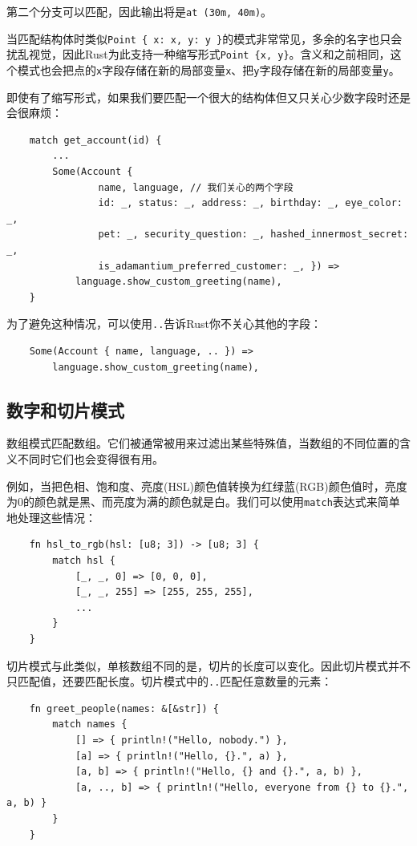 第二个分支可以匹配，因此输出将是\texttt{at (30m, 40m)}。

当匹配结构体时类似\texttt{Point \{ x: x, y: y \}}的模式非常常见，多余的名字也只会扰乱视觉，因此Rust为此支持一种缩写形式\texttt{Point \{x, y\}}。含义和之前相同，这个模式也会把点的\texttt{x}字段存储在新的局部变量\texttt{x}、把\texttt{y}字段存储在新的局部变量\texttt{y}。

即使有了缩写形式，如果我们要匹配一个很大的结构体但又只关心少数字段时还是会很麻烦：
\begin{verbatim}
    match get_account(id) {
        ...
        Some(Account {
                name, language, // 我们关心的两个字段
                id: _, status: _, address: _, birthday: _, eye_color: _,
                pet: _, security_question: _, hashed_innermost_secret: _,
                is_adamantium_preferred_customer: _, }) =>
            language.show_custom_greeting(name),
    }
\end{verbatim}

为了避免这种情况，可以使用\texttt{..}告诉Rust你不关心其他的字段：
\begin{verbatim}
    Some(Account { name, language, .. }) =>
        language.show_custom_greeting(name),
\end{verbatim}

\subsection{数字和切片模式}
数组模式匹配数组。它们被通常被用来过滤出某些特殊值，当数组的不同位置的含义不同时它们也会变得很有用。

例如，当把色相、饱和度、亮度(HSL)颜色值转换为红绿蓝(RGB)颜色值时，亮度为0的颜色就是黑、而亮度为满的颜色就是白。我们可以使用\texttt{match}表达式来简单地处理这些情况：
\begin{verbatim}
    fn hsl_to_rgb(hsl: [u8; 3]) -> [u8; 3] {
        match hsl {
            [_, _, 0] => [0, 0, 0],
            [_, _, 255] => [255, 255, 255],
            ...
        }
    }
\end{verbatim}

切片模式与此类似，单核数组不同的是，切片的长度可以变化。因此切片模式并不只匹配值，还要匹配长度。切片模式中的\texttt{..}匹配任意数量的元素：
\begin{verbatim}
    fn greet_people(names: &[&str]) {
        match names {
            [] => { println!("Hello, nobody.") },
            [a] => { println!("Hello, {}.", a) },
            [a, b] => { println!("Hello, {} and {}.", a, b) },
            [a, .., b] => { println!("Hello, everyone from {} to {}.", a, b) }
        }
    }
\end{verbatim}


